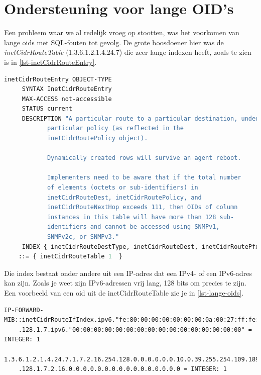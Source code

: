 \section{Ondersteuning voor lange OID's}
\label{probleem-lange-oids}

Een probleem waar we al redelijk vroeg op stootten, was het voorkomen van lange \glspl{oid} met SQL-fouten tot gevolg.
De grote boosdoener hier was de \textit{inetCidrRouteTable} (1.3.6.1.2.1.4.24.7) die zeer lange indexen heeft,
zoals te zien is in \cref{lst-inetCidrRouteEntry}.

\begin{lstlisting}[language=asn.1, float=h, caption={Definitie van een inetCidrRouteEntry}, label=lst-inetCidrRouteEntry]
inetCidrRouteEntry OBJECT-TYPE 
	 SYNTAX InetCidrRouteEntry
	 MAX-ACCESS not-accessible
	 STATUS current
	 DESCRIPTION "A particular route to a particular destination, under a 
            particular policy (as reflected in the 
            inetCidrRoutePolicy object). 
 
            Dynamically created rows will survive an agent reboot. 
 
            Implementers need to be aware that if the total number 
            of elements (octets or sub-identifiers) in 
            inetCidrRouteDest, inetCidrRoutePolicy, and 
            inetCidrRouteNextHop exceeds 111, then OIDs of column 
            instances in this table will have more than 128 sub- 
            identifiers and cannot be accessed using SNMPv1, 
            SNMPv2c, or SNMPv3."
	 INDEX { inetCidrRouteDestType, inetCidrRouteDest, inetCidrRoutePfxLen, inetCidrRoutePolicy, inetCidrRouteNextHopType, inetCidrRouteNextHop } 
 	::= { inetCidrRouteTable 1  }
\end{lstlisting}

Die index bestaat onder andere uit een IP-adres dat een IPv4- of een IPv6-adres kan zijn.
Zoals je weet zijn IPv6-adressen vrij lang, 128 bits om precies te zijn.
Een voorbeeld van een \gls{oid} uit de inetCidrRouteTable zie je in \cref{lst-lange-oids}.

\begin{lstlisting}[float=h, caption={Tekstuele en numerieke notatie van een \gls{oid} uit inetCidrRouteTable}, label=lst-lange-oids]
IP-FORWARD-MIB::inetCidrRouteIfIndex.ipv6."fe:80:00:00:00:00:00:00:0a:00:27:ff:fe:6d:bd:c5"
	.128.1.7.ipv6."00:00:00:00:00:00:00:00:00:00:00:00:00:00:00:00" = INTEGER: 1

1.3.6.1.2.1.4.24.7.1.7.2.16.254.128.0.0.0.0.0.0.10.0.39.255.254.109.189.197
	.128.1.7.2.16.0.0.0.0.0.0.0.0.0.0.0.0.0.0.0.0 = INTEGER: 1
\end{lstlisting}

